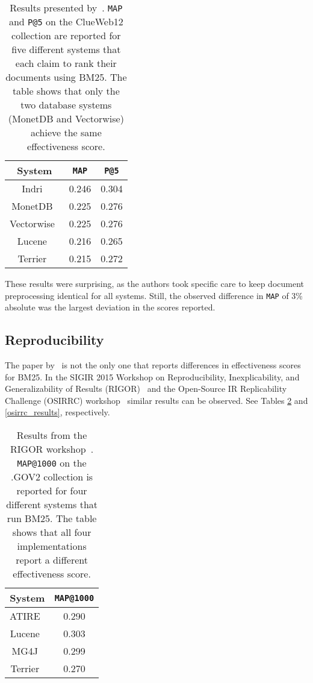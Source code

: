 \begin{table}
	\centering
	\caption{Results presented by~\citet{OldDog}. \texttt{MAP} and \texttt{P@5} on the ClueWeb12 collection are reported for five different systems that each claim to rank their documents using BM25. The table shows that only the two database systems (MonetDB and Vectorwise) achieve the same effectiveness score.}
	\label{olddog_results}
	\begin{tabular}{c c c}
		\toprule
		System &  \texttt{MAP} & \texttt{P@5} \\
		\midrule
		Indri~\citep{indri} & 0.246 & 0.304 \\
		MonetDB~\citep{monet} & 0.225 & 0.276 \\
		Vectorwise~\citep{vectorwise} & 0.225 & 0.276 \\
		Lucene~\citep{lucene} & 0.216 & 0.265 \\
		Terrier~\citep{terrier} & 0.215 & 0.272 \\
		\bottomrule
	\end{tabular}
\end{table}

These results were surprising, as the authors took specific care to keep document preprocessing identical for all systems. Still, the observed difference in \texttt{MAP} of 3\% absolute was the largest deviation in the scores reported. 

\subsection{Reproducibility}
The paper by~\citet{OldDog} is not the only one that reports differences in effectiveness scores for BM25. In the SIGIR 2015 Workshop on Reproducibility, Inexplicability, and Generalizability of Results (RIGOR)~\citep{RIGOR} and the Open-Source IR Replicability Challenge (OSIRRC) workshop~\citep{OSIRRC} similar results can be observed. See Tables  \ref{rigor_results} and \ref{osirrc_results}, respectively. %

\begin{table}
	\centering
	\caption{Results from the RIGOR workshop~\citep{RIGOR}. \texttt{MAP@1000} on the .GOV2 collection is reported for four different systems that run BM25. The table shows that all four implementations report a different effectiveness score.}
	\label{rigor_results}
	\begin{tabular}{c c}
		\toprule
		System &  \texttt{MAP@1000} \\
		\midrule
		ATIRE~\citep{ATIRE} & 0.290 \\
		Lucene~\citep{lucene} & 0.303 \\
		MG4J~\citep{MG4J} & 0.299 \\
		Terrier~\citep{terrier} & 0.270 \\
		\bottomrule
	\end{tabular}
\end{table}

